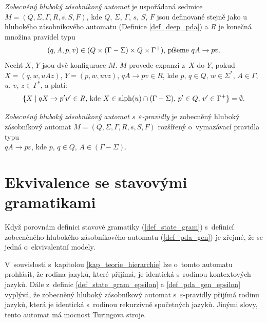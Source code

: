 \begin{Def} \label{def_pda_gen}
\emph{Zobecněný hluboký zásobníkový automat} je uspořádaná sedmice \\$M = (Q,\Sigma,\Gamma, R, s, S, F)$, 
kde $Q$, $\Sigma$, $\Gamma$, $s$, $S$, $F$ jsou definované stejně jako u hlubokého zásobníkového automatu (Definice \ref{def_deep_pda}) a $R$ je konečná množina pravidel typu 
\begin{equation*} 
(q, A, p, v) \in (Q \times (\Gamma-\Sigma) \times Q \times {\Gamma}^+)\textnormal{, píšeme }qA \rightarrow pv. 
\end{equation*}
Nechť $X$, $Y$ jsou dvě konfigurace $M$.  $M$ provede expanzi z~$X$ do $Y$, pokud $X = (q, w, uAz)$, $Y = (p, w, uvz)$, $qA \rightarrow pv \in R$, kde $p$, $q \in Q$, $w \in \Sigma^*$, $A \in \Gamma$, $u$, $v$, $z \in \Gamma^*$, a platí:
\begin{equation*} 
\{X \mid qX \rightarrow p'v' \in R\textnormal{, kde }X \in \mathrm{alph}(u) \cap (\Gamma - \Sigma)\textnormal{, }p' \in Q\textnormal{, }v' \in {\Gamma}^+ \} = \emptyset. 
\end{equation*}
\end{Def}

\begin{Def}\label{def_pda_gen_epsilon}
\emph{Zobecněný hluboký zásobníkový automat s~$\varepsilon$-pravidly} je zobecněný hluboký zásobníkový automat $M = (Q,\Sigma,\Gamma, R, s, S, F)$ rozšířený o~vymazávací pravidla typu\\ $qA \rightarrow p\varepsilon$, kde $p$, $q \in Q$, $A \in (\Gamma - \Sigma)$.
\end{Def}


 \section{Ekvivalence se stavovými gramatikami} \label{sec_ekv_state_grammars}

Když porovnám definici stavové gramatiky (\ref{def_state_gram}) s~definicí zobecněného hlubokého zásobníkového automatu (\ref{def_pda_gen}) je zřejmé, že se jedná o~ekvivalentní modely.

V~souvislosti s~kapitolou \ref{kap_teorie_hierarchie} lze o~tomto automatu prohlásit, že rodina jazyků, které přijímá, je identická s~rodinou kontextových jazyků. Dále z~definic \ref{def_state_gram_epsilon} a \ref{def_pda_gen_epsilon} vyplývá, že zobecněný hluboký zásobníkový automat s~$\varepsilon$-pravidly přijímá rodinu jazyků, která je identická s~rodinou  rekurzivně spočetných jazyků. Jinými slovy, tento automat má mocnost Turingova stroje.


